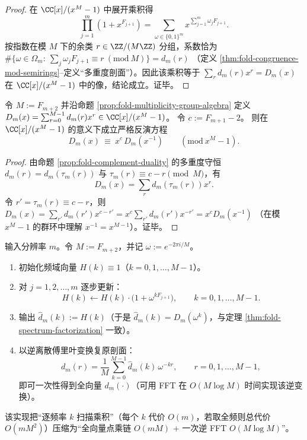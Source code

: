 \begin{proof}
在 \(\CC[x]/(x^{M}-1)\) 中展开乘积得
\[
\prod_{j=1}^{m}\left(1+x^{F_{j+1}}\right)
=\sum_{\omega\in\{0,1\}^m}x^{\sum_{j=1}^m \omega_jF_{j+1}}.
\]
按指数在模 \(M\) 下的余类 \(r\in\ZZ/(M\ZZ)\) 分组，系数恰为
\(
\#\{\omega\in\Omega_m:\ \sum_j \omega_jF_{j+1}\equiv r\ (\mathrm{mod}\ M)\}
=d_m(r)
\)
（定义 \ref{thm:fold-congruence-mod-semirings}--定义“多重度剖面”）。因此该乘积等于 \(\sum_r d_m(r)x^r=D_m(x)\) 在 \(\CC[x]/(x^M-1)\) 中的像，结论成立。证毕。
\end{proof}

\begin{corollary}\label{cor:fold-multiplicity-group-algebra-self-reciprocal}
令 \(M:=F_{m+2}\) 并沿命题 \ref{prop:fold-multiplicity-group-algebra} 定义 \(D_m(x)=\sum_{r=0}^{M-1}d_m(r)x^r\in \CC[x]/(x^M-1)\)。
令
\(
c:=F_{m+1}-2
\)。
则在 \(\CC[x]/(x^M-1)\) 的意义下成立严格反演方程
\[
\boxed{\;
D_m(x)\ \equiv\ x^{c}\,D_m(x^{-1})\qquad(\mathrm{mod}\ x^M-1).\;}
\]
\end{corollary}
\begin{proof}
由命题 \ref{prop:fold-complement-duality} 的多重度守恒 \(d_m(r)=d_m(\tau_m(r))\) 与 \(\tau_m(r)\equiv c-r\pmod M\)，有
\[
D_m(x)=\sum_{r}d_m(\tau_m(r))x^r.
\]
令 \(r'=\tau_m(r)\equiv c-r\)，则
\(
D_m(x)=\sum_{r'}d_m(r')x^{c-r'}=x^c\sum_{r'}d_m(r')x^{-r'}=x^cD_m(x^{-1})
\)
（在模 \(x^M-1\) 的群环中理解 \(x^{-1}=x^{M-1}\)）。证毕。
\end{proof}

\begin{algorithm}\label{alg:fold-multiplicity-fft}
输入分辨率 \(m\)。令 \(M:=F_{m+2}\)，并记 \(\omega:=e^{-2\pi i/M}\)。
\begin{enumerate}
  \item 初始化频域向量 \(H(k)\equiv 1\)（\(k=0,1,\dots,M-1\)）。
  \item 对 \(j=1,2,\dots,m\) 逐步更新：
  \[
  H(k)\leftarrow H(k)\cdot \bigl(1+\omega^{kF_{j+1}}\bigr),\qquad k=0,1,\dots,M-1.
  \]
  \item 输出 \(\widehat d_m(k):=H(k)\)（于是 \(\widehat d_m(k)=D_m(\omega^k)\)，与定理 \ref{thm:fold-spectrum-factorization} 一致）。
  \item 以逆离散傅里叶变换复原剖面：
  \[
  d_m(r)=\frac{1}{M}\sum_{k=0}^{M-1}\widehat d_m(k)\,\omega^{-kr},
  \qquad r=0,1,\dots,M-1,
  \]
  即可一次性得到全向量 \(d_m(\cdot)\)（可用 FFT 在 \(O(M\log M)\) 时间实现该逆变换）。
\end{enumerate}
该实现把“逐频率 \(k\) 扫描乘积”（每个 \(k\) 代价 \(O(m)\)，若取全频则总代价 \(O(mM^2)\)）压缩为“全向量点乘链 \(O(mM)\) + 一次逆 FFT \(O(M\log M)\)”。
\end{algorithm}


